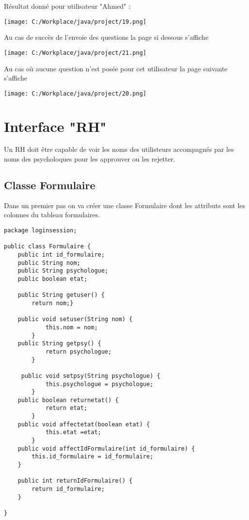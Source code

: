 \documentclass[12]{article}
\begin{document}
Résultat donné pour utilisateur "Ahmed" :\\

\begin{center}
\texttt{[image: C:/Workplace/java/project/19.png]}
\end{center}


Au cas de succès de l'envoie des questions la page si dessous s'affiche

\begin{center}
\texttt{[image: C:/Workplace/java/project/21.png]}
\end{center}


Au cas où aucune question n'est posée pour cet utilisateur la page suivante s'affiche

\begin{center}
\texttt{[image: C:/Workplace/java/project/20.png]}
\end{center}




\section{Interface "RH"}

Un RH doit être capable de voir les noms des utilisteurs accompagnés par les noms des psycholoques
pour les approuver ou les rejetter. 
\subsection{Classe Formulaire}

Dans un premier pas on va créer une classe Formulaire dont les attributs sont les colonnes du tableau formulaires.

\lstset{language=java}
\begin{lstlisting}
package loginsession;

public class Formulaire {
	public int id_formulaire;
	public String nom;
	public String psychologue;
	public boolean etat;
	
	public String getuser() {
		return nom;}
		
	public void setuser(String nom) {
	        this.nom = nom;
	    }
	public String getpsy() {
	        return psychologue;
	    }
	 
	 public void setpsy(String psychologue) {
	        this.psychologue = psychologue;
	    }
    public boolean returnetat() {
			return etat;
		}
    public void affectetat(boolean etat) {
			this.etat =etat;
		}
	public void affectIdFormulaire(int id_formulaire) {
        this.id_formulaire = id_formulaire;
    }
    
	public int returnIdFormulaire() {
        return id_formulaire;
    }

}
\end{lstlisting}
\end{document}
